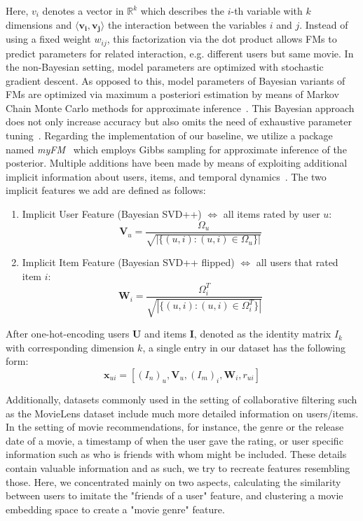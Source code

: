 \documentclass[10pt,conference,compsocconf]{IEEEtran}
\begin{document}
    Here, $v_i$ denotes a vector in $\mathbb{R}^k$ which describes the $i$-th variable with $k$ dimensions and $\langle \mathbf{v_i},\mathbf{v_j} \rangle$ the interaction between the variables $i$ and $j$.
    Instead of using a fixed weight $w_{ij}$, this factorization via the dot product allows FMs to predict parameters for related interaction, e.g. different users but same movie.
    In the non-Bayesian setting, model parameters are optimized with stochastic gradient descent.
    As opposed to this, model parameters of Bayesian variants of FMs are optimized via maximum a posteriori estimation by means of Markov Chain Monte Carlo methods for approximate inference~\cite{salakhutdinov_bayesian_2008}.
    This Bayesian approach does not only increase accuracy but also omits the need of exhaustive parameter tuning~\cite{freudenthaler_bayesian_2011}.
    Regarding the implementation of our baseline, we utilize a package named \textit{myFM}~\cite{noauthor_myfm_nodate} which employs Gibbs sampling for approximate inference of the posterior.
    Multiple additions have been made by means of exploiting additional implicit information about users, items, and temporal dynamics~\cite{rendle_scaling_2013,koren_factorization_2008,koren_collaborative_2009}.
    The two implicit features we add are defined as follows:
    \begin{enumerate}
        \item Implicit User Feature (Bayesian SVD++) $\Leftrightarrow$ all items rated by user $u$:
        $$\mathbf{V}_u=\frac{\Omega_u}{\sqrt{|\{(u,i): (u,i) \in \Omega_u\}|}}$$
        \item Implicit Item Feature (Bayesian SVD++ flipped) $\Leftrightarrow$ all users that rated item $i$:
        $$\mathbf{W}_i=\frac{\Omega^T_i}{\sqrt{|\{(u,i): (u,i) \in \Omega^T_i\}|}}$$
    \end{enumerate}
    After one-hot-encoding users $\mathbf{U}$ and items $\mathbf{I}$, denoted as the identity matrix $I_k$ with corresponding dimension $k$, a single entry in our dataset has the following form:
    $$\mathbf{x}_{ui} = [(I_n)_u,\mathbf{V}_u,(I_m)_i,\mathbf{W}_i, r_{ui}]$$

    Additionally, datasets commonly used in the setting of collaborative filtering such as the MovieLens dataset include much more detailed information on users/items.
    In the setting of movie recommendations, for instance, the genre or the release date of a movie, a timestamp of when the user gave the rating, or user specific information such as who is friends with whom might be included.
    These details contain valuable information and as such, we try to recreate features resembling those. %
    Here, we concentrated mainly on two aspects, calculating the similarity between users to imitate the "friends of a user" feature, and clustering a movie embedding space to create a "movie genre" feature.
\end{document}
